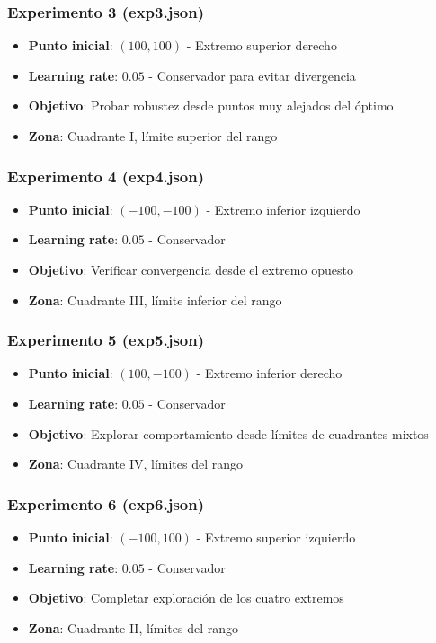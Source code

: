 \documentclass[12pt,a4paper]{article}
\begin{document}
\subsubsection*{Experimento 3 (exp3.json)}
\begin{itemize}
    \item \textbf{Punto inicial}: $(100, 100)$ - Extremo superior derecho
    \item \textbf{Learning rate}: $0.05$ - Conservador para evitar divergencia
    \item \textbf{Objetivo}: Probar robustez desde puntos muy alejados del óptimo
    \item \textbf{Zona}: Cuadrante I, límite superior del rango
\end{itemize}

\subsubsection*{Experimento 4 (exp4.json)}
\begin{itemize}
    \item \textbf{Punto inicial}: $(-100, -100)$ - Extremo inferior izquierdo
    \item \textbf{Learning rate}: $0.05$ - Conservador
    \item \textbf{Objetivo}: Verificar convergencia desde el extremo opuesto
    \item \textbf{Zona}: Cuadrante III, límite inferior del rango
\end{itemize}

\subsubsection*{Experimento 5 (exp5.json)}
\begin{itemize}
    \item \textbf{Punto inicial}: $(100, -100)$ - Extremo inferior derecho
    \item \textbf{Learning rate}: $0.05$ - Conservador
    \item \textbf{Objetivo}: Explorar comportamiento desde límites de cuadrantes mixtos
    \item \textbf{Zona}: Cuadrante IV, límites del rango
\end{itemize}

\subsubsection*{Experimento 6 (exp6.json)}
\begin{itemize}
    \item \textbf{Punto inicial}: $(-100, 100)$ - Extremo superior izquierdo
    \item \textbf{Learning rate}: $0.05$ - Conservador
    \item \textbf{Objetivo}: Completar exploración de los cuatro extremos
    \item \textbf{Zona}: Cuadrante II, límites del rango
\end{itemize}
\end{document}
